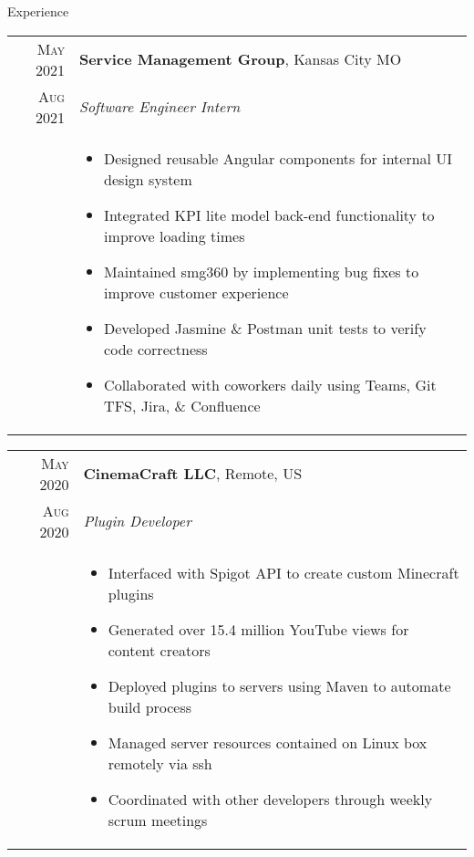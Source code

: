 \documentclass{resume}
\begin{document}
\begin{rSection}{Experience}
\small
{
  \begin{tabular}{r|p{15cm}}
    \textsc{May 2021} & \textbf{Service Management Group}, Kansas City MO \\
    \textsc{Aug 2021}  & \textit{Software Engineer Intern} \\ &
    \begin{itemize}
      \item {Designed reusable Angular components for internal UI design system}
      \item {Integrated KPI lite model back-end functionality to improve loading times}
      \item {Maintained smg360 by implementing bug fixes to improve customer experience}
      \item {Developed Jasmine \& Postman unit tests to verify code correctness}
      \item {Collaborated with coworkers daily using Teams, Git TFS, Jira, \& Confluence}
    \end{itemize}
  \end{tabular}
  
  \begin{tabular}{r|p{15cm}}
    \textsc{May 2020} & \textbf{CinemaCraft LLC}, Remote, US \\
    \textsc{Aug 2020}  & \textit{Plugin Developer} \\ &
    \begin{itemize}
      \item {Interfaced with Spigot API to create custom Minecraft plugins}
      \item {Generated over 15.4 million YouTube views for content creators}
      \item {Deployed plugins to servers using Maven to automate build process}
      \item {Managed server resources contained on Linux box remotely via ssh}
      \item {Coordinated with other developers through weekly scrum meetings}
    \end{itemize}
  \end{tabular}

}
\end{rSection}
\end{document}
